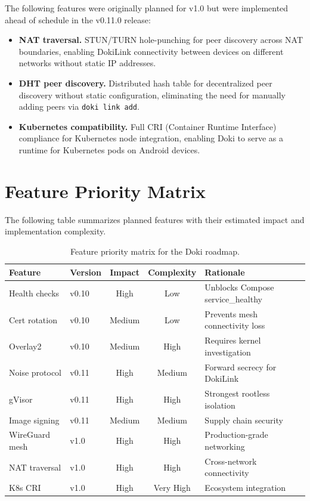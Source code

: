 The following features were originally planned for v1.0 but were
implemented ahead of schedule in the v0.11.0 release:

\begin{itemize}[leftmargin=*, itemsep=4pt]
  \item \textbf{NAT traversal.} STUN/TURN hole-punching for peer
        discovery across NAT boundaries, enabling DokiLink
        connectivity between devices on different networks without
        static IP addresses.

  \item \textbf{DHT peer discovery.} Distributed hash table for
        decentralized peer discovery without static configuration,
        eliminating the need for manually adding peers via
        \texttt{doki link add}.

  \item \textbf{Kubernetes compatibility.} Full CRI (Container
        Runtime Interface) compliance for Kubernetes node integration,
        enabling Doki to serve as a runtime for Kubernetes pods on
        Android devices.
\end{itemize}

\section{Feature Priority Matrix}
\label{sec:priority-matrix}

The following table summarizes planned features with their estimated
impact and implementation complexity.

\begin{table}[htbp]
  \centering
  \caption{Feature priority matrix for the Doki roadmap.}
  \label{tab:roadmap-priorities}
  \begin{tabularx}{\textwidth}{l l c c X}
    \toprule
    \textbf{Feature} & \textbf{Version} & \textbf{Impact} & \textbf{Complexity} & \textbf{Rationale} \\
    \midrule
    Health checks     & v0.10 & High   & Low    & Unblocks Compose service\_healthy \\
    Cert rotation     & v0.10 & Medium & Low    & Prevents mesh connectivity loss \\
    Overlay2          & v0.10 & Medium & High   & Requires kernel investigation \\
    Noise protocol    & v0.11 & High   & Medium & Forward secrecy for DokiLink \\
    gVisor            & v0.11 & High   & High   & Strongest rootless isolation \\
    Image signing     & v0.11 & Medium & Medium & Supply chain security \\
    WireGuard mesh    & v1.0  & High   & High   & Production-grade networking \\
    NAT traversal     & v1.0  & High   & High   & Cross-network connectivity \\
    K8s CRI           & v1.0  & High   & Very High & Ecosystem integration \\
    \bottomrule
  \end{tabularx}
\end{table}

